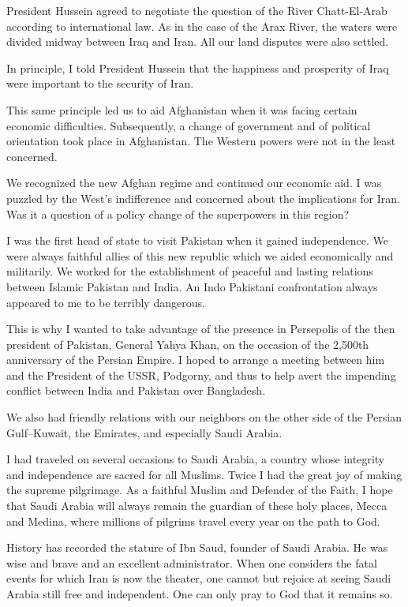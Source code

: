 President Hussein agreed to negotiate the question of the River Chatt-El-Arab according to international law. As in the case of the Arax River, the waters were divided midway between Iraq and Iran. All our land disputes were also settled. 

In principle, I told President Hussein that the happiness and prosperity of Iraq were important to the security of Iran. 

This same principle led us to aid Afghanistan when it was facing certain economic difficulties. Subsequently, a change of government and of political orientation took place in Afghanistan. The Western powers were not in the least concerned. 

We recognized the new Afghan regime and continued our economic aid. I was puzzled by the West's indifference and concerned about the implications for Iran. Was it a question of a policy change of the superpowers in this region? 

I was the first head of state to visit Pakistan when it gained independence. We were always faithful allies of this new republic which we aided economically and militarily. We worked for the establishment of peaceful and lasting relations between Islamic Pakistan and India. An Indo Pakistani confrontation always appeared to me to be terribly dangerous. 

This is why I wanted to take advantage of the presence in Persepolis of the then president of Pakistan, General Yahya Khan, on the occasion of the 2,500th anniversary of the Persian Empire. I hoped to arrange a meeting between him and the President of the USSR, Podgorny, and thus to help avert the impending conflict between India and Pakistan 
over Bangladesh. 


We also had friendly relations with our neighbors on the other side of the Persian Gulf--Kuwait, the Emirates, and especially Saudi Arabia. 

I had traveled on several occasions to Saudi Arabia, a country whose integrity and independence are sacred for all Muslims. Twice I had the great joy of making the supreme pilgrimage. As a faithful Muslim and Defender of the Faith, I hope that Saudi Arabia will always remain the guardian of these holy places, Mecca and Medina, where millions of pilgrims travel every year on the path to God. 

History has recorded the stature of Ibn Saud, founder of Saudi Arabia. He was wise and brave and an excellent administrator. When one considers the fatal events for which Iran is now the theater, one cannot but rejoice at seeing Saudi Arabia still free and independent. One can only pray to God that it remains so. 

